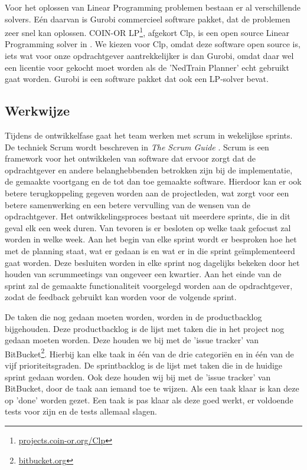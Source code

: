 Voor het oplossen van Linear Programming problemen bestaan er al verschillende solvers. E\'en daarvan is Gurobi commercieel software pakket, dat de problemen zeer snel kan oplossen. COIN-OR LP\footnote{\href{http://projects.coin-or.org/Clp}{projects.coin-or.org/Clp}}, afgekort Clp, is een open source Linear Programming solver in \cpp . We kiezen voor Clp, omdat deze software open source is, iets wat voor onze opdrachtgever aantrekkelijker is dan Gurobi, omdat daar wel een licentie voor gekocht moet worden als de 'NedTrain Planner' echt gebruikt gaat worden. Gurobi is een software pakket dat ook een LP-solver bevat.

\subsection{Werkwijze}
Tijdens de ontwikkelfase gaat het team werken met scrum in wekelijkse sprints. De techniek Scrum wordt beschreven in \emph{The Scrum Guide} \cite{schwaber2011}. Scrum is een framework voor het ontwikkelen van software dat ervoor zorgt dat de opdrachtgever en andere belanghebbenden betrokken zijn bij de implementatie, de gemaakte voortgang en de tot dan toe gemaakte software. Hierdoor kan er ook betere terugkoppeling gegeven worden aan de projectleden, wat zorgt voor een betere samenwerking en een betere vervulling van de wensen van de opdrachtgever. Het ontwikkelingsproces bestaat uit meerdere sprints, die in dit geval elk een week duren. Van tevoren is er besloten op welke taak gefocust zal worden in welke week. Aan het begin van elke sprint wordt er besproken hoe het met de planning staat, wat er gedaan is en wat er in die sprint ge\"implementeerd gaat worden. Deze besluiten worden in elke sprint nog dagelijks bekeken door het houden van scrummeetings van ongeveer een kwartier. Aan het einde van de sprint zal de gemaakte functionaliteit voorgelegd worden aan de opdrachtgever, zodat de feedback gebruikt kan worden voor de volgende sprint. 

De taken die nog gedaan moeten worden, worden in de productbacklog bijgehouden. Deze productbacklog is de lijst met taken die in het project nog gedaan moeten worden. Deze houden we bij met de 'issue tracker' van BitBucket\footnote{\href{http://bitbucket.org}{bitbucket.org}}. Hierbij kan elke taak in \'e\'en van de drie categori\"en en in \'e\'en van de vijf prioriteitsgraden. De sprintbacklog is de lijst met taken die in de huidige sprint gedaan worden. Ook deze houden wij bij met de 'issue tracker' van BitBucket, door de taak aan iemand toe te wijzen. Als een taak klaar is kan deze op 'done' worden gezet. Een taak is pas klaar als deze goed werkt, er voldoende tests voor zijn en de tests allemaal slagen.

